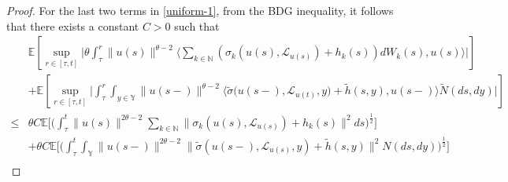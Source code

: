 \documentclass[11pt]{article}
\numberwithin{equation}{section}
\theoremstyle{plain}
\begin{document}
\begin{proof}
For the last two terms in \eqref{uniform-1}, 
from the BDG inequality, it follows that there exists a constant $C>0$ such that
\begin{align} \label{uniform-2}
	  &  \mathbb{E} 
	  	         \left[ \sup_{r \in [\tau, t]}
	                       	\Big| \theta 
	   	                               \int_{\tau}^{r}
	                               	 \|u(s)\|^{\theta-2}
	   	                            \big\langle  \sum_{k \in \mathbb{N} }
	                                     	\left( \sigma_k(u(s), \mathcal{L}_{u(s)}) + h_k(s) \right) dW_k(s),
	   	                               u(s)
	                              	\big\rangle
	                       	\Big|
	                \right] \nonumber\\
 	& +  \mathbb{E} 
 		         \left[ \sup_{r \in [\tau,t]}
 	                 \Big| \int_{\tau}^{r} 
 	                            \int_{y \in \mathbb{Y} }
 	                                \|u(s-)\|^{\theta-2}
                                    	\big\langle
 	                                             \widetilde{\sigma}\big(u(s-), \mathcal{L}_{u(t)}, y\big)
 	                                             + \widetilde{h}(s,y),
 	                                             u(s-)
             	                        \big\rangle
 	                                 \widetilde{N}(ds,dy)
 	                 \Big|
 	              \right]  \nonumber\\	                
 \le & \theta C
        	\mathbb{E}
        	     \Biggl[
 	                  \biggl( \int_{\tau}^{t}
                                    	\|u(s)\|^{2\theta-2}
 	                                       \sum_{k \in \mathbb{N} }
 	                                           \bigl\| \sigma_k(u(s),\mathcal{L}_{u(s)}) + h_k(s)
 	                                           \bigr\|^{2}
 	                                ds
 	                 \biggr)^{\frac12}
 	             \Biggr]  \nonumber \\
	 & + \theta C
            	\mathbb{E}
            	     \Biggl[
                       	 \Biggl( \int_{\tau}^{t} 
                       	                \int_{\mathbb{Y} } 
                                       	   \|u(s-)\|^{2\theta-2}
                    	                   \bigl\| \widetilde{\sigma}(u(s-),\mathcal{L}_{u(s)}, y) 
	                                                 + \widetilde{h}(s,y)
	                                       \bigr\|^{2}
	                                 N(ds, dy)
	                     \Biggr)^{\frac{1}{2}}
	                 \Biggr]  \nonumber \\ 	 

\end{align}
\end{proof}
\end{document}
